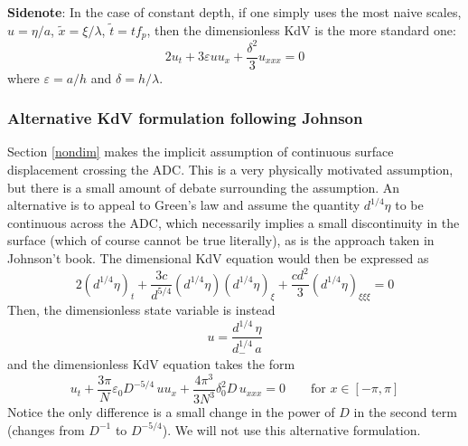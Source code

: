 \documentclass[11pt]{article}
\newcommand{\eps}{\varepsilon}
\newcommand{\freqp}{f_p}
\newcommand{\amp}{a}
\newcommand{\depth}{d}
\newcommand{\dup}{\depth_{-}}
\newcommand{\lam}{\lambda}
\newcommand{\lamfac}{N}
\newcommand{\drat}{D}
\newcommand{\epsup}{\eps_0}
\newcommand{\delup}{\delta_0}
\begin{document}
{\bf Sidenote}: In the case of constant depth, if one simply uses the most naive scales, $u = \eta/\amp$, $\tilde{x} = \xi/\lam$, $\tilde{t} = t \freqp$, then the dimensionless KdV is the more standard one:
\begin{equation}
2 u_t + 3 \eps u u_x + \frac{\delta^2}{3} u_{xxx} = 0
\end{equation}
where $\eps = a/h$ and $\delta = h/\lam$.


\subsubsection{Alternative KdV formulation following Johnson}
Section \ref{nondim} makes the implicit assumption of continuous surface displacement crossing the ADC. This is a very physically motivated assumption, but there is a small amount of debate surrounding the assumption. An alternative is to appeal to Green's law and assume the quantity $\depth^{1/4} \eta$ to be continuous across the ADC, which necessarily implies a small discontinuity in the surface (which of course cannot be true literally), as is the approach taken in Johnson't book. The dimensional KdV equation would then be expressed as
\begin{equation}
2 (\depth^{1/4} \eta)_t + \frac{3 c}{\depth^{5/4}} (\depth^{1/4} \eta) (\depth^{1/4} \eta)_{\xi} + \frac{c \depth^2}{3} (\depth^{1/4} \eta)_{\xi \xi \xi} = 0
\end{equation}
Then, the dimensionless state variable is instead 
\begin{equation}
u = \frac{\depth^{1/4} \, \eta}{ \dup^{1/4} \, \amp}
\end{equation}
and the dimensionless KdV equation takes the form
\begin{equation}
u_t + \frac{3 \pi}{\lamfac} \epsup \drat^{-5/4} \, u u_x + \frac{4 \pi^3}{3 \lamfac^3} \delup^2 \drat \, u_{xxx} = 0
\qquad \text{for } x \in [-\pi,\pi]
\end{equation}
Notice the only difference is a small change in the power of $\drat$ in the second term (changes from $\drat^{-1}$ to $\drat^{-5/4}$).
We will not use this alternative formulation.

\end{document}
